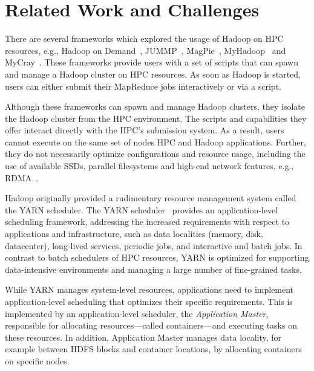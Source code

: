 \section{Related Work and Challenges}
\label{sec:hpc_hadoop_rel}

There are several frameworks which explored the usage of Hadoop on HPC
resources, e.g., Hadoop on Demand~\cite{hod}, JUMMP~\cite{moody2013jummp},
MagPie~\cite{chu2015magpie}, MyHadoop~\cite{krishnan2011myhadoop} and
MyCray~\cite{mycray}. These frameworks provide users with a set of scripts that
can spawn and manage a Hadoop cluster on HPC resources. As soon as Hadoop is
started, users can either submit their MapReduce jobs interactively or via a
script.

Although these frameworks can spawn and manage Hadoop clusters, they isolate the
Hadoop cluster from the HPC environment. The scripts and capabilities they offer
interact directly with the HPC's submission system. As a result, users cannot
execute on the same set of nodes HPC and Hadoop applications. Further, they do
not necessarily optimize configurations and resource usage, including the use of
available SSDs, parallel filesystems and high-end network features, e.g.,
RDMA~\cite{rahman2014homr}.

Hadoop originally provided a rudimentary resource management system called the
YARN scheduler. The YARN scheduler~\cite{vavilapalli2013apache} provides an
application-level scheduling framework, addressing the increased requirements
with respect to applications and infrastructure, such as data localities
(memory, disk, datacenter), long-lived services, periodic jobs, and interactive
and batch jobs. In contrast to batch schedulers of HPC resources, YARN is
optimized for supporting data-intensive environments and managing a large number
of fine-grained tasks.

While YARN manages system-level resources, applications need to implement
application-level scheduling that optimizes their specific requirements. This is
implemented by an application-level scheduler, the \textit{Application Master},
responsible for allocating resources---called containers---and executing tasks
on these resources. In addition, Application Master manages data locality, for
example between HDFS blocks and container locations, by allocating containers on
specific nodes.

